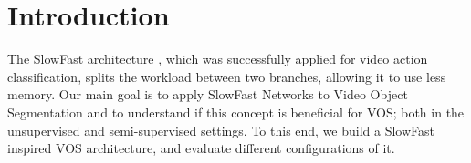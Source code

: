 \section{Introduction}
The SlowFast architecture \cite{slow_fast}, which was successfully applied for video action classification, splits the workload between two branches, allowing it to use less memory. 
Our main goal is to apply SlowFast Networks \cite{slow_fast}  to Video Object Segmentation and to understand if this concept is beneficial for VOS; both in the unsupervised and semi-supervised settings. To this end, we build a SlowFast inspired VOS architecture, and evaluate different configurations of it.